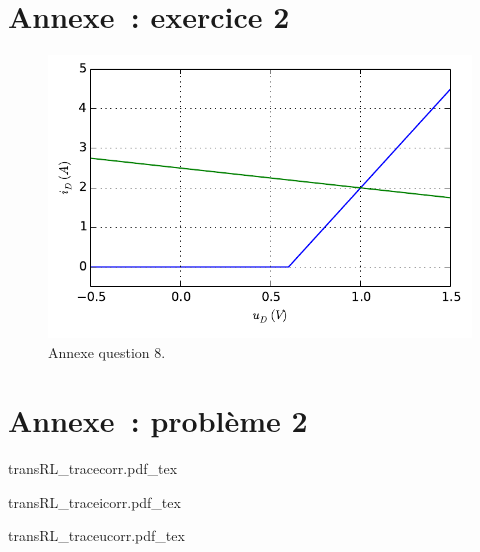 \documentclass[a4paper, 10pt, garamond, oneside]{book}
\begin{document}
{	\chapter*{Annexe~: exercice 2}
	\vfill
	\begin{figure}[htbp]
		\centering
		\includegraphics[width=\linewidth]{diode_annexecorr}
		\caption{Annexe question 8.}
		\label{fig:diode_annexecorr}
	\end{figure}
	\vfill

	\chapter{Annexe~: problème 2}
	\begin{center}
		{transRL_tracecorr.pdf_tex}
		\label{fig:annexe_p2-1_corr}
	\end{center}
	\begin{center}
		{transRL_traceicorr.pdf_tex}
		\label{fig:annexe_p2-2_corr}
	\end{center}
	\begin{center}
		{transRL_traceucorr.pdf_tex}
		\label{fig:annexe_p2-3_corr}
	\end{center}
}
\vspace{-20pt}
\end{document}
